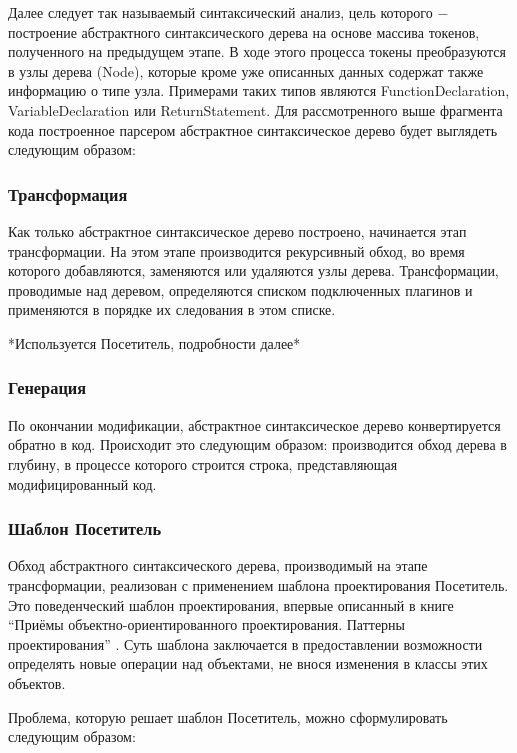 \documentclass[14pt, a4paper]{article}
\begin{document}
Далее следует так называемый синтаксический анализ, цель которого $-$ построение абстрактного 
синтаксического дерева на основе массива токенов, полученного на предыдущем этапе. В ходе этого 
процесса токены преобразуются в узлы дерева (Node), которые кроме уже описанных данных содержат также
информацию о типе узла. Примерами таких типов являются FunctionDeclaration, VariableDeclaration или 
ReturnStatement. Для рассмотренного выше фрагмента кода построенное парсером абстрактное синтаксическое 
дерево будет выглядеть следующим образом:



\subsubsection*{Трансформация}
Как только абстрактное синтаксическое дерево построено, начинается этап трансформации. На этом этапе 
производится рекурсивный обход, во время которого добавляются, заменяются или удаляются узлы дерева.
Трансформации, проводимые над деревом, определяются списком подключенных плагинов и применяются в 
порядке их следования в этом списке.

*Используется Посетитель, подробности далее* 

\subsubsection*{Генерация}
По окончании модификации, абстрактное синтаксическое дерево конвертируется обратно в код. 
Происходит это следующим образом: производится обход дерева в глубину, в процессе которого строится строка,
представляющая модифицированный код.

\subsubsection{Шаблон Посетитель}

Обход абстрактного синтаксического дерева, производимый на этапе трансформации, реализован с применением 
шаблона проектирования Посетитель. Это поведенческий шаблон проектирования, впервые описанный в книге 
``Приёмы объектно-ориентированного проектирования. Паттерны проектирования'' \cite{gang_of_4}.
Суть шаблона заключается в предоставлении возможности определять новые операции над объектами,
 не внося изменения в классы этих объектов.

Проблема, которую решает шаблон Посетитель, можно сформулировать следующим образом:
\end{document}
